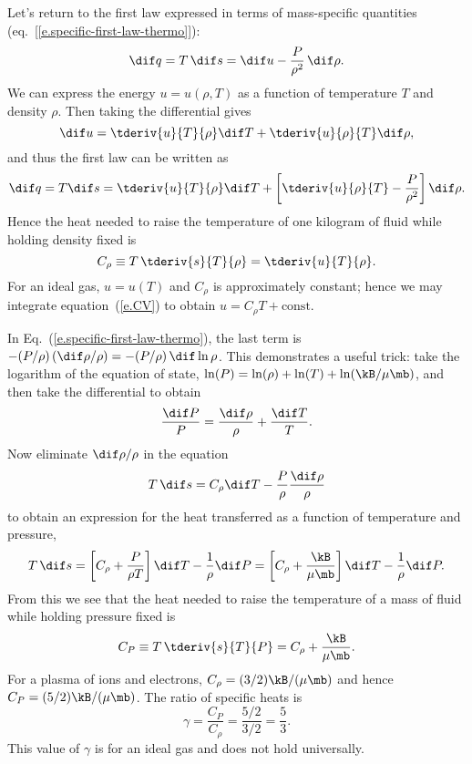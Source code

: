 Let's return to the first law expressed in terms of mass-specific quantities (eq.~[\ref{e.specific-first-law-thermo}]):
\[
	\dif q = T\,\dif s = \dif u -\frac{P}{\rho^{2}}\,\dif \rho.
\]
We can express the energy $u = u(\rho,T)$ as a function of temperature $T$ and density $\rho$. Then taking the differential gives
\[ \dif u = \tderiv{u}{T}{\rho}\dif T + \tderiv{u}{\rho}{T}\dif \rho, \]
and thus the first law can be written as
\[ \dif q = T\dif s = \tderiv{u}{T}{\rho}\dif T + \left[\tderiv{u}{\rho}{T} - \frac{P}{\rho^{2}}\right]\dif \rho. \]
Hence the heat needed to raise the temperature of one kilogram of fluid while holding density fixed is
\begin{equation}\label{e.CV}
C_{\rho} \equiv T\,\tderiv{s}{T}{\rho} = \tderiv{u}{T}{\rho}.
\end{equation}
For an ideal gas, $u = u(T)$ and $C_{\rho}$ is approximately constant; hence we may integrate equation~(\ref{e.CV}) to obtain $u = C_{\rho}T + \textrm{const}$.

In Eq.~(\ref{e.specific-first-law-thermo}), the last term is $-(P/\rho)\, (\dif\rho/\rho) = -(P/\rho)\,\dif\ln\rho$. This demonstrates a useful trick: take the logarithm of the equation of state, $\ln (P) = \ln(\rho) + \ln (T) + \ln (\kB/\mu\mb)$, and then take the differential to obtain
\[ \frac{\dif P}{P} = \frac{\dif\rho}{\rho} + \frac{\dif T}{T}. \]
Now eliminate $\dif\rho/\rho$ in the equation
\[ T\,\dif s = C_{\rho}\dif T - \frac{P}{\rho}\frac{\dif\rho}{\rho} \]
to obtain an expression for the heat transferred as a function of temperature and pressure,
\begin{equation}\label{e.first-law-pressure-temperature}
T\,\dif s = \left[C_{\rho} + \frac{P}{\rho T}\right]\dif T - \frac{1}{\rho}\dif P
	 = \left[C_{\rho} + \frac{\kB}{\mu\mb}\right]\dif T - \frac{1}{\rho}\dif P.
\end{equation}
From this we see that the heat needed to raise the temperature of a mass of fluid while holding pressure fixed is
\begin{equation}\label{e.CP}
C_{P}\equiv T\,\tderiv{s}{T}{P} = C_{\rho} + \frac{\kB}{\mu\mb}.
\end{equation}
For a plasma of ions and electrons, $C_\rho = (3/2)\kB/(\mu\mb)$ and hence $C_P = (5/2)\kB/(\mu\mb)$.  The ratio of specific heats is
\begin{equation}\label{e.gamma}
    \gamma = \frac{C_P}{C_\rho} = \frac{5/2}{3/2} = \frac{5}{3}.
\end{equation}
This value of $\gamma$ is for an ideal gas and does not hold universally.

